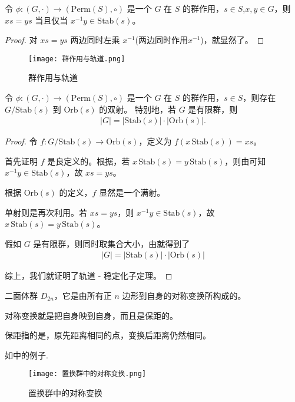 \documentclass[../../main.tex]{subfiles}
\begin{document}
\begin{lemma}\label{lemma:稳定化子引理1}
令 $\phi:(G,\cdot)\to(\mathrm{Perm}(S),\circ)$ 是一个 $G$ 在 $S$ 的群作用，$s\in S$,$x,y\in G$，则 $xs = ys$ 当且仅当 $x^{-1}y\in\mathrm{Stab}(s)$。
\end{lemma}
\begin{proof}
对 $xs = ys$ 两边同时左乘 $x^{-1}$(两边同时作用$x^{-1}$)，就显然了。 
\end{proof}

\begin{figure}[H]
\centering
\texttt{[image: 群作用与轨道.png]}
\caption{群作用与轨道}
\label{figure:群作用与轨道}
\end{figure}

\begin{theorem}[轨道 - 稳定化子定理]\label{theorem:轨道 - 稳定化子定理}
令 $\phi:(G,\cdot)\to(\mathrm{Perm}(S),\circ)$ 是一个 $G$ 在 $S$ 的群作用，$s\in S$，则存在 $G/\mathrm{Stab}(s)$ 到 $\mathrm{Orb}(s)$ 的双射。
特别地，若 $G$ 是有限群，则
\begin{align*}
|G| = |\mathrm{Stab}(s)|\cdot|\mathrm{Orb}(s)|.
\end{align*}
\end{theorem}
\begin{proof}
令 $f:G/\mathrm{Stab}(s)\to\mathrm{Orb}(s)$，定义为 $f(x\,\mathrm{Stab}(s)) = xs$。

首先证明 $f$ 是良定义的。根据，若 $x\,\mathrm{Stab}(s)=y\,\mathrm{Stab}(s)$，则由可知$x^{-1}y\in\mathrm{Stab}(s)$，故 $xs = ys$。

根据 $\mathrm{Orb}(s)$ 的定义，$f$ 显然是一个满射。

单射则是再次利用。若 $xs = ys$，则 $x^{-1}y\in\mathrm{Stab}(s)$，故 $x\,\mathrm{Stab}(s)=y\,\mathrm{Stab}(s)$。

假如 $G$ 是有限群，则同时取集合大小，由就得到了
\begin{align*}
|G| = |\mathrm{Stab}(s)|\cdot|\mathrm{Orb}(s)|
\end{align*}

综上，我们就证明了轨道 - 稳定化子定理。 
\end{proof}


\begin{definition}
二面体群 $D_{2n}$，它是由所有正 $n$ 边形到自身的对称变换所构成的。

对称变换就是把自身映到自身，而且是保距的。

保距指的是，原先距离相同的点，变换后距离仍然相同。
\end{definition}
\begin{note}
如中的例子. 
\begin{figure}[H]
\centering
\texttt{[image: 置换群中的对称变换.png]}
\caption{置换群中的对称变换}
\label{figure:置换群中的对称变换}
\end{figure}
\end{note}
\end{document}
